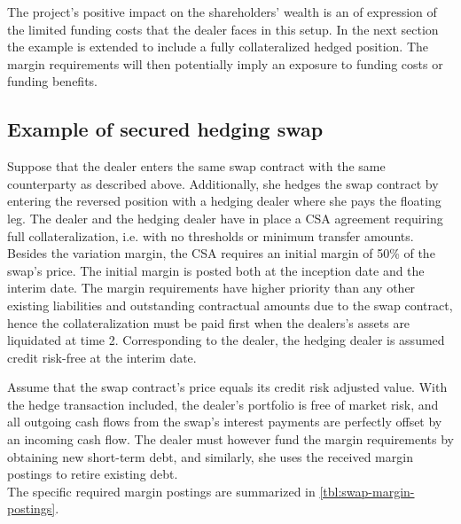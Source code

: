 \documentclass[main.tex]{subfiles}
\begin{document}
            The project's positive impact on the shareholders' wealth is an of expression of the limited funding costs
            that the dealer faces in this setup.
            In the next section the example is extended to include a fully collateralized hedged position.
            The margin requirements will then potentially imply an exposure to funding costs or funding benefits.

        \subsection{Example of secured hedging swap}
            Suppose that the dealer enters the same swap contract with the same counterparty as described above.
            Additionally, she hedges the swap contract by entering the reversed position with a hedging dealer
            where she pays the floating leg.
            The dealer and the hedging dealer have in place a CSA agreement 
            requiring full collateralization, i.e. with no thresholds or minimum transfer amounts.
            Besides the variation margin,
            the CSA requires an initial margin of 50\% of the swap's price.
            The initial margin is posted both at the inception date and the interim date.
            The margin requirements have higher priority than any other existing liabilities and outstanding contractual amounts due to the swap contract,
            hence the collateralization must be paid first when the dealers's assets are liquidated at time 2.
            Corresponding to the dealer, the hedging dealer is assumed credit risk-free at the interim date.

            Assume that the swap contract's price equals its credit risk adjusted value.
            With the hedge transaction included,
            the dealer's portfolio is free of market risk,
            and all outgoing cash flows from the swap's interest payments
            are perfectly offset by an incoming cash flow.
            The dealer must however fund the margin requirements by obtaining new short-term debt,
            and similarly, she uses the received margin postings to retire existing debt.
            \\
            The specific required margin postings are summarized in \cref{tbl:swap-margin-postings}.
\end{document}
